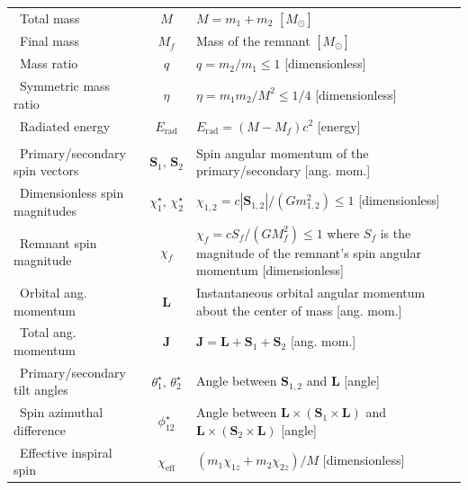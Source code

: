 {\begin{longtable}{lcp{9cm}}
\, Total mass & $M$ &
$M=m_1+m_2$ $[M_\odot]$ \\

\, Final mass & $M_f$ &
Mass of the remnant $[M_\odot]$ \\

\, Mass ratio & $q$ &
$q=m_2/m_1\leq 1$ [dimensionless] \\

\, Symmetric mass ratio & $\eta$ &
$\eta=m_1m_2/M^2\leq 1/4$ [dimensionless] \\

\, Radiated energy & $E_\mathrm{rad}$ &
$E_\mathrm{rad}=(M-M_f)c^2$ [energy] \\

\addlinespace[5pt]
\multicolumn{3}{l}{\textit{\textbf{Spin parameters}}} \\
\hline
\addlinespace[5pt]

\, Primary/secondary spin vectors & $\mathbf{S}_1,\,\mathbf{S}_2$ &
Spin angular momentum of the primary/secondary [ang. mom.] \\

\, Dimensionless spin magnitudes & $\chi_1^\star,\,\chi_2^\star$ &
$\chi_{1,2}=c|\mathbf{S}_{1,2}|/(Gm_{1,2}^2)\leq 1$ [dimensionless] \\

\, Remnant spin magnitude & $\chi_f$ &
$\chi_f=cS_f/(GM_f^2)\leq 1$  where $S_f$ is the magnitude of the remnant's spin
angular momentum [dimensionless] \\

\, Orbital ang. momentum & $\mathbf{L}$ &
Instantaneous orbital angular momentum about the center of mass [ang. mom.] \\

\, Total ang. momentum & $\mathbf{J}$ &
$\mathbf{J}=\mathbf{L}+\mathbf{S}_1+\mathbf{S}_2$ [ang. mom.] \\

\, Primary/secondary tilt angles & $\theta_1^\star,\,\theta_2^\star$ &
Angle between $\mathbf{S}_{1,2}$ and $\mathbf{L}$ [angle] \\

\, Spin azimuthal difference & $\phi_{12}^\star$ &
Angle between $\mathbf{L}\times(\mathbf{S}_1\times\mathbf{L})$ and $\mathbf{L}\times(\mathbf{S}_2\times\mathbf{L})$ [angle] \\

\, Effective inspiral spin & $\chi_\mathrm{eff}$ &
$(m_1\chi_{1z}+m_2\chi_{2z})/M$ [dimensionless] \\


\end{longtable}}
